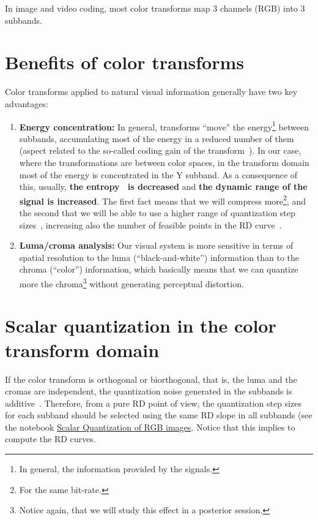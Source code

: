 In image and video coding, most color transforms map 3 channels
($\text{RGB}$) into 3 subbands.

\section{Benefits of color transforms}

Color transforms applied to natural visual information generally have
two key advantages:
\begin{enumerate}
\item \textbf{Energy concentration:} In general, transforms ``move''
  the energy\footnote{In general, the information provided by the
    signals.} between subbands, accumulating most of the energy in a
  reduced number of them (aspect related to the so-called coding gain
  of the transform~\cite{vruiz__transform_coding}). In our case, where
  the transformations are between color spaces, in the transform
  domain most of the energy is concentrated in the $\text{Y}$
  subband. As a consequence of this, usually, \textbf{the
    entropy~\cite{vruiz__information_theory} is decreased} and
  \textbf{the dynamic range of the signal is increased}. The first
  fact means that we will compress more\footnote{For the same
    bit-rate.}, and the second that we will be able to use a higher
  range of quantization step
  sizes~\cite{vruiz__scalar_quantization,sayood2017introduction},
  increasing also the number of feasible points in the RD
  curve~\cite{vruiz__information_theory}.
\item \textbf{Luma/croma analysis:} Our visual system is more
  sensitive in terms of spatial resolution to the luma
  (``black-and-white'') information than to the chroma (``color'')
  information, which basically means that we can quantize more the
  chroma\footnote{Notice again, that we will study this effect in a
  posterior session.} without generating perceptual distortion. 
\end{enumerate}

\section{Scalar quantization in the color transform domain}

If the color transform is orthogonal or biorthogonal, that is, the luma
and the cromas are independent, the quantization noise generated in
the subbands is additive~\cite{burger2016digital}. Therefore, from a
pure RD point of view, the quantization step sizes for each subband
should be selected using the same RD slope in all subbands (see
the notebook
\href{https://github.com/vicente-gonzalez-ruiz/color_transforms/blob/main/docs/RGB/RGB_SQ.ipynb}{Scalar
  Quantization of RGB images}. Notice that this implies to compute the
RD curves.

